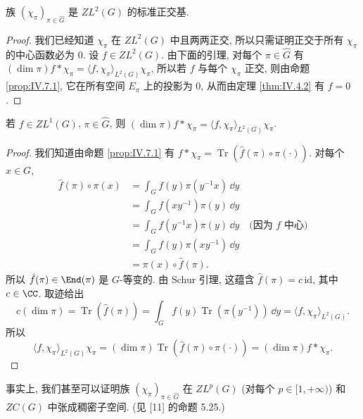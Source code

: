 \begin{corollary}[$ZL^2(G)$ 的基]
\label{cor:IV.7.5}
族 $(\chi_{\pi})_{\pi \in \widehat{G}}$ 是 $ZL^2(G)$ 的标准正交基.
\end{corollary}

\begin{proof}
我们已经知道 $\chi_{\pi}$ 在 $ZL^2(G)$ 中且两两正交, 所以只需证明正交于所有 $\chi_{\pi}$ 的中心函数必为 $0$. 设 $f \in ZL^2(G)$. 由下面的引理, 对每个 $\pi \in \widehat{G}$ 有 $(\dim\pi)f * \chi_{\pi} = \langle f, \chi_{\pi} \rangle_{L^2(G)}\chi_{\pi}$, 所以若 $f$ 与每个 $\chi_{\pi}$ 正交, 则由命题 \ref{prop:IV.7.1}, 它在所有空间 $E_{\pi}$ 上的投影为 $0$, 从而由定理 \ref{thm:IV.4.2} 有 $f = 0$.
\end{proof}

\begin{lemma}[中心函数的傅里叶变换]
\label{lem:IV.7.6}
若 $f \in ZL^1(G)$, $\pi \in \widehat{G}$, 则 $(\dim\pi)f * \chi_{\pi} = \langle f, \chi_{\pi} \rangle_{L^2(G)}\chi_{\pi}$.
\end{lemma}

\begin{proof}
我们知道由命题 \ref{prop:IV.7.1} 有 $f * \chi_{\pi} = \operatorname{Tr}(\hat{f}(\pi) \circ \pi(\cdot))$. 对每个 $x \in G$,
\begin{align*}
\hat{f}(\pi) \circ \pi(x) &= \int_G f(y)\pi(y^{-1}x)\,\dd y \\
&= \int_G f(xy^{-1})\pi(y)\,\dd y \\
&= \int_G f(y^{-1}x)\pi(y)\,\dd y \quad \text{(因为 } f \text{ 中心)} \\
&= \int_G f(y)\pi(xy^{-1})\,\dd y \\
&= \pi(x) \circ \hat{f}(\pi).
\end{align*}
所以 $\hat{f}(\pi) \in \End(\pi)$ 是 $G$-等变的. 由 Schur 引理, 这蕴含 $\hat{f}(\pi) = c\,\mathrm{id}$, 其中 $c \in \CC$. 取迹给出
\[
c(\dim\pi) = \operatorname{Tr}(\hat{f}(\pi)) = \int_G f(y)\operatorname{Tr}(\pi(y^{-1}))\,\dd y = \langle f, \chi_{\pi} \rangle_{L^2(G)}.
\]
所以
\[
\langle f, \chi_{\pi} \rangle_{L^2(G)}\chi_{\pi} = (\dim\pi)\operatorname{Tr}(\hat{f}(\pi) \circ \pi(\cdot)) = (\dim\pi)f * \chi_{\pi}.
\]
\end{proof}

\begin{remark}[$ZL^p(G)$ 中的稠密性]
\label{rem:IV.7.7}
事实上, 我们甚至可以证明族 $(\chi_{\pi})_{\pi \in \widehat{G}}$ 在 $ZL^p(G)$ (对每个 $p \in [1, +\infty)$) 和 $ZC(G)$ 中张成稠密子空间. (见 {[}11{]} 的命题 5.25.)
\end{remark}


